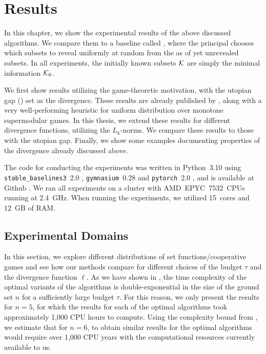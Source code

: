 \chapter{Results}
\label{chap:results}

In this chapter, we show the experimental results of the above discussed algorithms.
We compare them to a baseline called \algRand{}, where the principal chooses which subsets to reveal uniformly at random from the as of yet unrevealed subsets.
In all experiments, the initially known subsets $ \mathcal{K} $ are simply the minimal information $ \mathcal{K}_0 $.

We first show results utilizing the game-theoretic motivation, with the utopian gap () set as the divergence.
These results are already published by \cite{uradnik2024reducing}, along with a very well-performing heuristic for uniform distribution over monotone supermodular games.
In this thesis, we extend these results for different divergence functions, utilizing the $ L_k $-norms.
We compare these results to those with the utopian gap.
Finally, we show some examples documenting properties of the divergence already discussed above.

The code for conducting the experiments was written in Python~3.10 using \texttt{stable\_baselines3}~2.0 \citep{stable-baselines3}, \texttt{gymnasium}~0.28 \citep{towers_gymnasium_2023} and \texttt{pytorch}~2.0 \citep{Ansel_PyTorch_2_Faster_2024}, and is available at Github \citep{gitrepo}.
We ran all experiments on a cluster with AMD~EPYC~7532~CPUs running at 2.4~GHz.
When running the experiments, we utilized 15~cores and 12~GB of RAM.

\section{Experimental Domains}

In this section, we explore different distributions of set functions/cooperative games and see how our methods compare for different choices of the budget $ \tau $ and the divergence function $ \ell $.
As we have shown in , the time complexity of the optimal variants of the algorithms is double-exponential in the size of the ground set $ n $ for a sufficiently large budget $ \tau $.
For this reason, we only present the results for $ n=5 $, for which the results for each of the optimal algorithms took approximately 1,000 CPU hours to compute.
Using the complexity bound from , we estimate that for $ n=6 $, to obtain similar results for the optimal algorithms  would require over 1,000 CPU years with the computational resources currently available to us.

